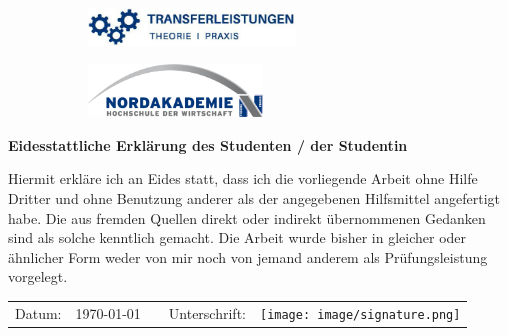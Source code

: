 \pagebreak
\thispagestyle{empty}

\setlength{\parindent}{0pt}

\begin{figure}[t]
	\vspace*{-2.9\baselineskip}
	\begin{subfigure}[b]{0.6\textwidth}
		\includegraphics[height=1cm, left]{image/transferleistung.jpg}
	\end{subfigure}
	\begin{subfigure}[b]{0.4\textwidth}
		\includegraphics[height=1.4cm, right]{image/Nordakademie_Logo_Large.jpg}
	\end{subfigure}
\end{figure}
\begin{figure}[t]
\end{figure}


\vspace*{\fill}

\large
\textcolor{blue!30!black}{\textbf{Eidesstattliche Erklärung des Studenten / der Studentin }}
\newline

\normalsize
Hiermit erkläre ich an Eides statt, dass ich die vorliegende Arbeit ohne Hilfe Dritter und ohne
Benutzung anderer als der angegebenen Hilfsmittel angefertigt habe. Die aus fremden
Quellen direkt oder indirekt übernommenen Gedanken sind als solche kenntlich gemacht.
Die Arbeit wurde bisher in gleicher oder ähnlicher Form weder von mir noch von jemand
anderem als Prüfungsleistung vorgelegt.
\newline

\begin{tabular}{ p{1.2cm}p{4.5cm}p{2cm}p{2cm}p{4.5cm} }
    Datum: & \today & & Unterschrift: & \texttt{[image: image/signature.png]}\\\cline{2-2}\cline{5-5}
\end{tabular}

\vspace*{\fill}
